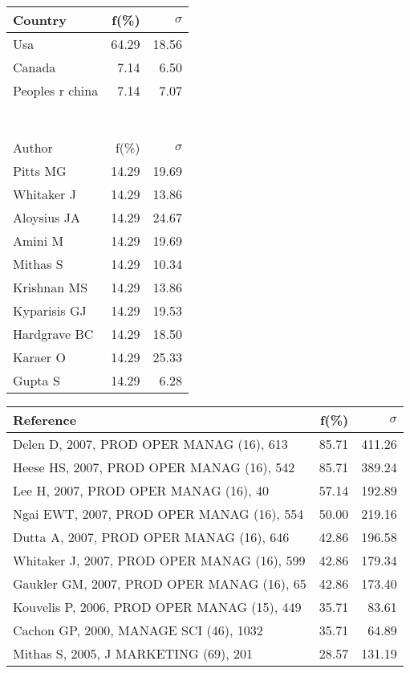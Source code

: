 \documentclass[a4paper,11pt]{report}
\begin{document}
\begin{landscape}
\begin{table}[!ht]
{\begin{tabular}{|l r r|}
\hline
\hline
Country & f(\%) & $\sigma$\\
\hline
Usa & 64.29 & 18.56\\
Canada & 7.14 & 6.50\\
Peoples r china & 7.14 & 7.07\\
 &  & \\
 &  & \\
 &  & \\
 &  & \\
 &  & \\
 &  & \\
 &  & \\
\hline
\hline
Author & f(\%) & $\sigma$\\
\hline
Pitts MG & 14.29 & 19.69\\
Whitaker J & 14.29 & 13.86\\
Aloysius JA & 14.29 & 24.67\\
Amini M & 14.29 & 19.69\\
Mithas S & 14.29 & 10.34\\
Krishnan MS & 14.29 & 13.86\\
Kyparisis GJ & 14.29 & 19.53\\
Hardgrave BC & 14.29 & 18.50\\
Karaer O & 14.29 & 25.33\\
Gupta S & 14.29 & 6.28\\
\hline
\end{tabular}
}
{\scriptsize\begin{tabular}{|l r r|}
\hline
Reference & f(\%) & $\sigma$\\
\hline
Delen D, 2007, PROD OPER MANAG (16), 613 & 85.71 & 411.26\\
Heese HS, 2007, PROD OPER MANAG (16), 542 & 85.71 & 389.24\\
Lee H, 2007, PROD OPER MANAG (16), 40 & 57.14 & 192.89\\
Ngai EWT, 2007, PROD OPER MANAG (16), 554 & 50.00 & 219.16\\
Dutta A, 2007, PROD OPER MANAG (16), 646 & 42.86 & 196.58\\
Whitaker J, 2007, PROD OPER MANAG (16), 599 & 42.86 & 179.34\\
Gaukler GM, 2007, PROD OPER MANAG (16), 65 & 42.86 & 173.40\\
Kouvelis P, 2006, PROD OPER MANAG (15), 449 & 35.71 & 83.61\\
Cachon GP, 2000, MANAGE SCI (46), 1032 & 35.71 & 64.89\\
Mithas S, 2005, J MARKETING (69), 201 & 28.57 & 131.19\\

\end{tabular}}
\end{table}
\end{landscape}
\end{document}

